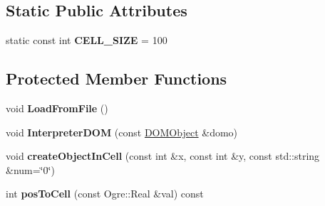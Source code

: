 \subsection*{Static Public Attributes}
\begin{DoxyCompactItemize}
\item 
static const int {\bfseries C\+E\+L\+L\+\_\+\+S\+I\+ZE} = 100\hypertarget{class_terrain_a98fdc36982387d0cb430342423aae6e4}{}\label{class_terrain_a98fdc36982387d0cb430342423aae6e4}

\end{DoxyCompactItemize}
\subsection*{Protected Member Functions}
\begin{DoxyCompactItemize}
\item 
void {\bfseries Load\+From\+File} ()\hypertarget{class_terrain_afd6ee4f91ff4298e572431135a0e63f2}{}\label{class_terrain_afd6ee4f91ff4298e572431135a0e63f2}

\item 
void {\bfseries Interpreter\+D\+OM} (const \hyperlink{class_terrain_1_1_d_o_m_object}{D\+O\+M\+Object} \&domo)\hypertarget{class_terrain_adb42c31dd75631476b5802560c34466e}{}\label{class_terrain_adb42c31dd75631476b5802560c34466e}

\item 
void {\bfseries create\+Object\+In\+Cell} (const int \&x, const int \&y, const std\+::string \&num=\char`\"{}0\char`\"{})\hypertarget{class_terrain_a7691ac72600c48070289ccb91248fbcb}{}\label{class_terrain_a7691ac72600c48070289ccb91248fbcb}

\item 
int {\bfseries pos\+To\+Cell} (const Ogre\+::\+Real \&val) const \hypertarget{class_terrain_ad86cc66637b53a00b3fb4cd5ff39ef95}{}\label{class_terrain_ad86cc66637b53a00b3fb4cd5ff39ef95}

\end{DoxyCompactItemize}
